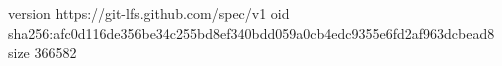 version https://git-lfs.github.com/spec/v1
oid sha256:afc0d116de356be34c255bd8ef340bdd059a0cb4edc9355e6fd2af963dcbead8
size 366582
